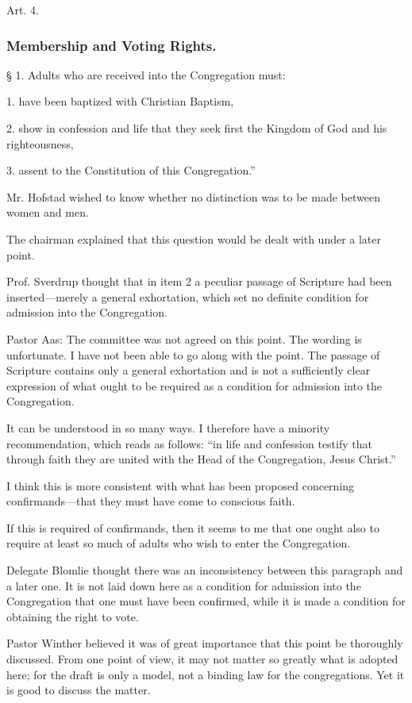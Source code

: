 Art. 4.

\subsubsection{Membership and Voting Rights.}

§ 1. Adults who are received into the Congregation must:

1. have been baptized with Christian Baptism,

2. show in confession and life that they seek first the Kingdom of God and his righteousness,

3. assent to the Constitution of this Congregation.”

Mr. Hofstad wished to know whether no distinction was to be made between women and men.

The chairman explained that this question would be dealt with under a later point.

Prof. Sverdrup thought that in item 2 a peculiar passage of Scripture had been inserted—merely a general exhortation, which set no definite condition for admission into the Congregation.

Pastor Aas: The committee was not agreed on this point. The wording is unfortunate. I have not been able to go along with the point. The passage of Scripture contains only a general exhortation and is not a sufficiently clear expression of what ought to be required as a condition for admission into the Congregation.

It can be understood in so many ways. I therefore have a minority recommendation, which reads as follows: “in life and confession testify that through faith they are united with the Head of the Congregation, Jesus Christ.”

I think this is more consistent with what has been proposed concerning confirmands—that they must have come to conscious faith.

If this is required of confirmands, then it seems to me that one ought also to require at least so much of adults who wish to enter the Congregation.

Delegate Blomlie thought there was an inconsistency between this paragraph and a later one. It is not laid down here as a condition for admission into the Congregation that one must have been confirmed, while it is made a condition for obtaining the right to vote.

Pastor Winther believed it was of great importance that this point be thoroughly discussed. From one point of view, it may not matter so greatly what is adopted here; for the draft is only a model, not a binding law for the congregations. Yet it is good to discuss the matter.

